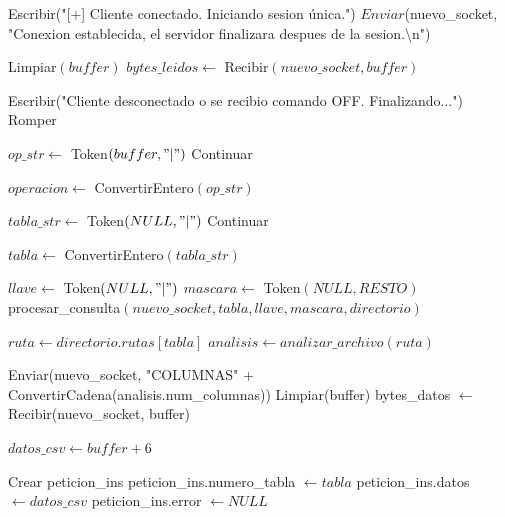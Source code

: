 \begin{tcolorbox}[colback=white, colframe=azul_unam, 
title=Pseudocódigo: servidor.c, breakable]
\begin{algorithmic}[1]
\State Escribir("[+] Cliente conectado. Iniciando sesion única.")
\State $Enviar$(nuevo\_socket, "Conexion establecida, el servidor finalizara despues de la sesion.\textbackslash n")

\vspace{0.2cm}



    \State Limpiar$(buffer)$
    \State $bytes\_leidos \gets$ Recibir$(nuevo\_socket, buffer)$

        \State Escribir("Cliente desconectado o se recibio comando OFF. Finalizando...")
        \State Romper
    \EndIf

    \State $op\_str \gets$ Token$(buffer, "|")$
        \State Continuar
    \EndIf

    \State $operacion \gets$ ConvertirEntero$(op\_str)$

    \State $tabla\_str \gets$ Token$(NULL, "|")$
        \State Continuar
    \EndIf

    \State $tabla \gets$ ConvertirEntero$(tabla\_str)$


        \State $llave \gets$ Token$(NULL, "|")$
        \State $mascara \gets$ Token$(NULL, RESTO)$
        \State procesar\_consulta$(nuevo\_socket, tabla, llave, mascara, directorio)$



        \State $ruta \gets directorio.rutas[tabla]$
        \State $analisis \gets analizar\_archivo(ruta)$

        \State Enviar(nuevo\_socket, "COLUMNAS\textbar" + ConvertirCadena(analisis.num\_columnas))
        \State Limpiar(buffer)
        \State bytes\_datos $\gets$ Recibir(nuevo\_socket, buffer)


            \State $datos\_csv \gets buffer + 6$

            \State Crear peticion\_ins
            \State peticion\_ins.numero\_tabla $\gets tabla$
            \State peticion\_ins.datos $\gets datos\_csv$
            \State peticion\_ins.error $\gets NULL$


\end{algorithmic}
\end{tcolorbox}
